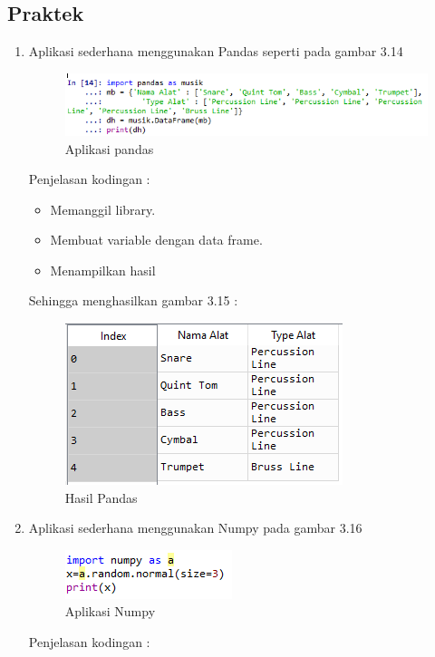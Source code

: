 \subsection{Praktek}
\begin{enumerate}
\item Aplikasi sederhana menggunakan Pandas seperti pada gambar 3.14
	\begin{figure}[ht]
	\centering
	\includegraphics[scale=0.7]{figures/PRF/1_1.png}
	\caption{Aplikasi pandas}
	\end{figure}
	\par Penjelasan kodingan :
		\begin{itemize}
		\item Memanggil library.
		\item Membuat variable dengan data frame.
		\item Menampilkan hasil
		\end{itemize}
	\par Sehingga menghasilkan gambar 3.15 :
	\begin{figure}[ht]
	\centering
	\includegraphics[scale=0.7]{figures/PRF/1_2.png}
	\caption{Hasil Pandas}
	\end{figure}
\item Aplikasi sederhana menggunakan Numpy pada gambar 3.16
	\begin{figure}[ht]
	\centering
	\includegraphics[scale=0.9]{figures/PRF/2_1.png}
	\caption{Aplikasi Numpy}
	\end{figure}
	\par Penjelasan kodingan :
		\begin{itemize}

\end{itemize}
\end{enumerate}
